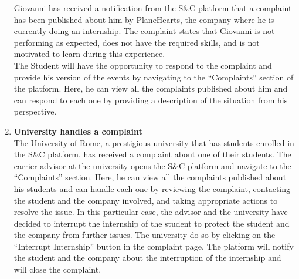 \begin{enumerate}
        Giovanni has received a notification from the S\&C platform that a complaint has been published about him by PlaneHearts, the company where he is currently doing an internship. The complaint states that Giovanni is not performing as expected, does not have the required skills, and is not motivated to learn during this experience.\\
        The Student will have the opportunity to respond to the complaint and provide his version of the events by navigating to the “Complaints” section of the platform. Here, he can view all the complaints published about him and can respond to each one by providing a description of the situation from his perspective.
    \item \textbf{\textcolor{titleColor}{University handles a complaint}}\\
        The University of Rome, a prestigious university that has students enrolled in the S\&C platform, has received a complaint about one of their students. The carrier advisor at the university opens the S\&C platform and navigate to the “Complaints” section. Here, he can view all the complaints published about his students and can handle each one by reviewing the complaint, contacting the student and the company involved, and taking appropriate actions to resolve the issue.
        In this particular case, the advisor and the university have decided to interrupt the internship of the student to protect the student and the company from further issues. The university do so by clicking on the “Interrupt Internship” button in the complaint page. The platform will notify the student and the company about the interruption of the internship and will close the complaint.
\end{enumerate}
